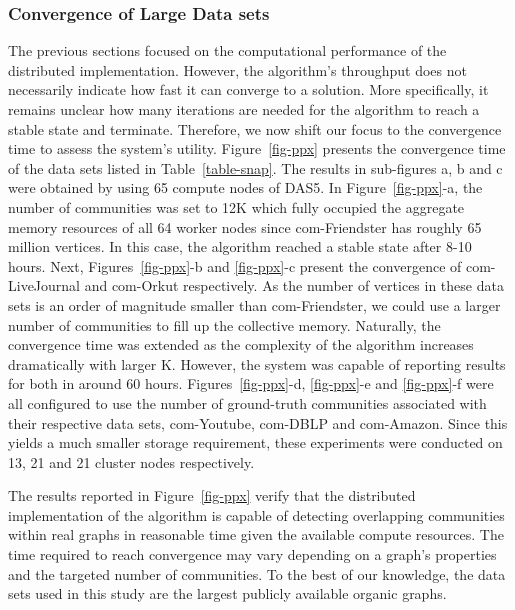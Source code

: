 \subsubsection{Convergence of Large Data sets}

The previous sections focused on the computational performance of the
distributed implementation. However, the algorithm's throughput does not
necessarily indicate how fast it can converge to a solution. More specifically, it
remains unclear how many iterations are needed for the algorithm to reach a
stable state and terminate. Therefore, we now shift our focus to the
convergence time to assess the system's utility. Figure~\ref{fig-ppx} presents
the convergence time of the data sets listed in Table~\ref{table-snap}.
%
The results in sub-figures a, b and c were obtained by using 65 compute nodes
of DAS5. In Figure~\ref{fig-ppx}-a, the number of communities was set to 12K
which fully occupied the aggregate memory resources of all 64 worker nodes since
com-Friendster has roughly 65 million vertices. In this case, the algorithm
reached a stable state after 8-10 hours. Next, Figures~\ref{fig-ppx}-b and
\ref{fig-ppx}-c present the convergence of com-LiveJournal and com-Orkut
respectively. As the number of vertices in these data sets is an order of
magnitude smaller than com-Friendster, we could use a larger number of
communities to fill up the collective memory. Naturally, the convergence time was extended as the complexity of
the algorithm increases dramatically with larger K. However, the system was
capable of reporting results for both in around 60 hours.
%
Figures~\ref{fig-ppx}-d, \ref{fig-ppx}-e and \ref{fig-ppx}-f were all
configured to use the number of ground-truth communities associated with
their respective data sets, com-Youtube, com-DBLP and com-Amazon. Since this
yields a much smaller storage requirement,
these experiments were conducted on 13, 21 and 21 cluster nodes respectively.

The results reported in Figure~\ref{fig-ppx} verify that the distributed
implementation of the algorithm is capable of detecting overlapping communities
within real graphs in reasonable time given the available compute resources.
The time required to reach convergence may vary depending on a graph's properties and
the targeted number of communities. To the best of our knowledge, the data sets
used in this study are the largest publicly available organic graphs.

